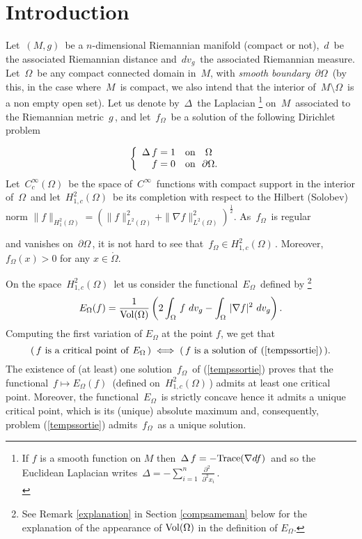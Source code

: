 \documentclass[11pt, reqno]{amsart}
\theoremstyle{plain}
\begin{document}
\section{Introduction}
Let $\,(M,g)\,$ be a $n$-dimensional Riemannian manifold (compact or not), $\,d\,$ be the associated Riemannian
distance and $\,dv_g\,$ the associated Riemannian measure. Let $\,\Omega\,$ be any compact 
connected domain in $\,M$, with {\it smooth boundary} $\,\partial \Omega\,$ (by this, in the case where
$\,M\,$ is compact, we also intend that the interior of $\,M \setminus \Omega\,$ is a non empty open set). 
Let us denote by $\,\Delta\,$ the Laplacian
\footnote{If  $f$ is a smooth function on $M$ then $\,\Delta \, f = - {\rm Trace} ( \nabla d f )\,$ and so  the Euclidean Laplacian writes
$\,\Delta = - \sum_{i = 1}^n \, \frac{\partial^2\, \ }{\partial^2 x_i}\,$.\\} on $\,M\,$ associated to  the 
Riemannian metric $\,g\,$, and let 
$\,f_\Omega\,$  be a  solution 
of the following Dirichlet problem

\begin{equation}\label{tempssortie}
\left\{\begin{array}{l}
\Delta \, f = 1 \ \ \ {\rm on}\ \ \  \Omega \ \ \\
\ \ \ f = 0 \  \ \  {\rm on}\    \  \partial \Omega .\ \ 
\end{array}\right. \,
\end{equation}
Let $\,C_c^\infty (\Omega) \,$ be the space of $\,C^\infty \,$ functions with compact 
support in the interior  of $\,\Omega\,$ and let $\,H_{1,c}^2 (\Omega)\,$ be its completion with respect to the Hilbert (Solobev) norm 
$\| f \|_{H_1^2(\Omega)} = (\| f \|^2_{L^2(\Omega)} + \| \nabla f \|^2_{L^2(\Omega)})^\frac{1}{2}$.  
As  $\,f_\Omega\,$  is regular

and vanishes on 
$\,\partial \Omega\,$,  it is  not hard to see that $\, f_\Omega\in H_{1,c}^2 (\Omega)\,$. Moreover, $f_\Omega(x) > 0$ for any $x\in \mathring\Omega$.

 On the space $\,H_{1,c}^2 (\Omega)\,$  let us consider the functional $\,E_\Omega\,$ 
defined by \footnote{See   Remark \ref{explanation}  in Section \ref{compsameman}  below for the explanation  of the appearance of  ${\rm Vol} (\Omega)$ in the definition of $E_\Omega$.}
\begin{equation}\label{EOmega}
E_\Omega (f) = \dfrac{1}{{\rm Vol} (\Omega)} \left(2 \int_\Omega \, f\ dv_g - 
\int_\Omega \,|\nabla f|^2 \ dv_g\right).
\end{equation}
Computing the first variation of $E_\Omega$ at the point $f$, we get
that 
$$(\, f\ {\rm is\ a\ critical\ point\ of}\ E_\Omega \,) \iff (\, f\ {\rm is\ a\ solution\ 
of\ (\ref{tempssortie})}\, ) .$$
The existence of (at least) one solution $\,f_\Omega\,$ of (\ref{tempssortie}) proves 
that the functional  $\,f \mapsto E_\Omega (f)\,$ (defined on $\,H_{1,c}^2 (\Omega)\,$) admits at least one critical point.
Moreover, the functional $\,E_\Omega\,$ is  strictly concave 
hence it admits a unique critical point, which is its (unique) absolute maximum and, consequently,  problem (\ref{tempssortie}) admits $\,f_\Omega\,$ as a unique solution.
\end{document}
